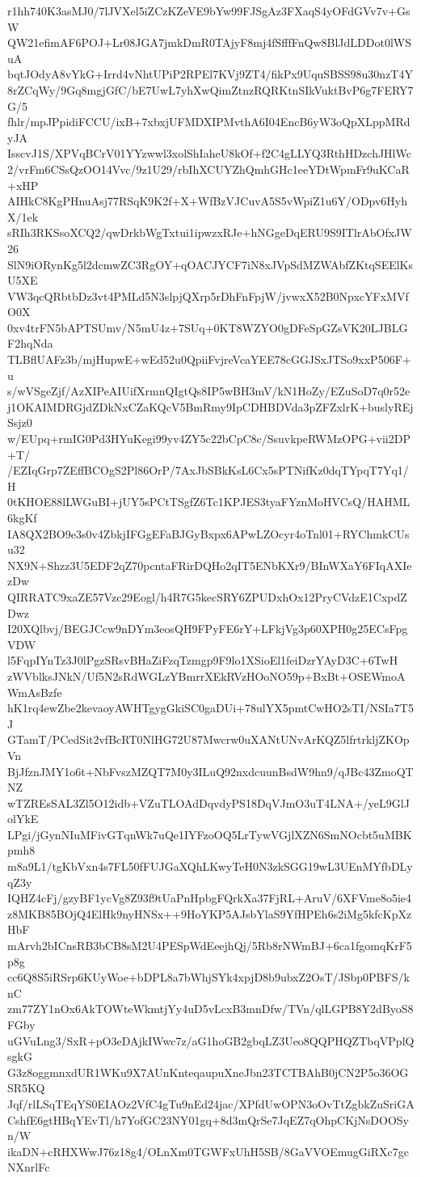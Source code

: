 r1hh740K3asMJ0/7lJVXel5iZCzKZeVE9bYw99FJSgAz3FXaqS4yOFdGVv7v+GsW
QW21efimAF6POJ+Lr08JGA7jmkDmR0TAjyF8mj4fSfffFnQw8BlJdLDDot0lWSuA
bqtJOdyA8vYkG+Irrd4vNhtUPiP2RPEl7KVj9ZT4/fikPx9UquSBSS98u30nzT4Y
8rZCqWy/9Gq8mgjGfC/bE7UwL7yhXwQimZtnzRQRKtnSIkVuktBvP6g7FERY7G/5
fhlr/mpJPpidiFCCU/ixB+7xbxjUFMDXIPMvthA6I04EncB6yW3oQpXLppMRdyJA
IsscvJ1S/XPVqBCrV01YYzwwl3xolShIaheU8kOf+f2C4gLLYQ3RthHDzchJHlWc
2/vrFm6CSsQzOO14Vvc/9z1U29/rbIhXCUYZhQmhGHc1eeYDtWpmFr9uKCaR+xHP
AIHkC8KgPHnuAsj77RSqK9K2f+X+WfBzVJCuvA5S5vWpiZ1u6Y/ODpv6HyhX/1ek
sRIh3RKSsoXCQ2/qwDrkbWgTxtui1ipwzxRJe+hNGgeDqERU9S9ITlrAbOfxJW26
SlN9iORynKg5l2dcmwZC3RgOY+qOACJYCF7iN8xJVpSdMZWAbfZKtqSEElKsU5XE
VW3qcQRbtbDz3vt4PMLd5N3slpjQXrp5rDhFnFpjW/jvwxX52B0NpxcYFxMVfO0X
0xv4trFN5bAPTSUmv/N5mU4z+7SUq+0KT8WZYO0gDFeSpGZsVK20LJBLGF2hqNda
TLBflUAFz3b/mjHupwE+wEd52u0QpiiFvjreVcaYEE78cGGJSxJTSo9xxP506F+u
s/wVSgeZjf/AzXIPeAIUifXrmnQIgtQs8IP5wBH3mV/kN1HoZy/EZuSoD7q0r52e
j1OKAIMDRGjdZDkNxCZaKQcV5BmRmy9IpCDHBDVda3pZFZxlrK+buslyREjSsjz0
w/EUpq+rmIG0Pd3HYuKegi99yv4ZY5c22bCpC8c/SsuvkpeRWMzOPG+vii2DP+T/
/EZIqGrp7ZEffBCOgS2Pl86OrP/7AxJbSBkKsL6Cx5sPTNifKz0dqTYpqT7Yq1/H
0tKHOE88lLWGuBI+jUY5sPCtTSgfZ6Tc1KPJES3tyaFYznMoHVCsQ/HAHML6kgKf
IA8QX2BO9e3s0v4ZbkjIFGgEFaBJGyBxpx6APwLZOcyr4oTnl01+RYChmkCUsu32
NX9N+Shzz3U5EDF2qZ70pcntaFRirDQHo2qIT5ENbKXr9/BInWXaY6FIqAXIezDw
QIRRATC9xaZE57Vzc29Eogl/h4R7G5kecSRY6ZPUDxhOx12PryCVdzE1CxpdZDwz
I20XQlbvj/BEGJCcw9nDYm3eosQH9FPyFE6rY+LFkjVg3p60XPH0g25ECsFpgVDW
l5FqpIYnTz3J0lPgzSRsvBHaZiFzqTzmgp9F9lo1XSioEl1feiDzrYAyD3C+6TwH
zWVblksJNkN/Uf5N2sRdWGLzYBmrrXEkRVzHOoNO59p+BxBt+OSEWmoAWmAsBzfe
hK1rq4ewZbe2kevaoyAWHTgygGkiSC0gaDUi+78ulYX5pmtCwHO2sTI/NSIa7T5J
GTamT/PCedSit2vfBcRT0NlHG72U87Mwcrw0uXANtUNvArKQZ5lfrtrkljZKOpVn
BjJfznJMY1o6t+NbFvszMZQT7M0y3ILuQ92nxdcuunBsdW9hn9/qJBc43ZmoQTNZ
wTZREsSAL3Zl5O12idb+VZuTLOAdDqvdyPS18DqVJmO3uT4LNA+/yeL9GlJolYkE
LPgi/jGynNIuMFivGTqnWk7uQe1IYFzoOQ5LrTywVGjlXZN6SmNOcbt5uMBKpmh8
m8a9L1/tgKbVxn4s7FL50fFUJGaXQhLKwyTeH0N3zkSGG19wL3UEnMYfbDLyqZ3y
IQHZ4cFj/gzyBF1ycVg8Z93f9tUaPnHpbgFQrkXa37FjRL+AruV/6XFVme8o5ie4
z8MKB85BOjQ4ElHk9nyHNSx++9HoYKP5AJsbYlaS9YfHPEh6s2iMg5kfcKpXzHbF
mArvh2bICnsRB3bCB8sM2U4PESpWdEeejhQj/5Rb8rNWmBJ+6ca1fgomqKrF5p8g
cc6Q8S5iRSrp6KUyWoe+bDPL8a7bWhjSYk4xpjD8b9ubxZ2OsT/JSbp0PBFS/knC
zm77ZY1nOx6AkTOWteWkmtjYy4uD5vLcxB3mnDfw/TVn/qlLGPB8Y2dByoS8FGby
uGVuLng3/SxR+pO3eDAjkIWwc7z/aG1hoGB2gbqLZ3Ueo8QQPHQZTbqVPplQsgkG
G3z8oggmnxdUR1WKu9X7AUnKnteqaupuXneJbn23TCTBAhB0jCN2P5o36OGSR5KQ
Jqf/rlLSqTEqYS0EIAOz2VfC4gTu9nEd24jac/XPfdUwOPN3oOvTtZgbkZuSriGA
CshfE6gtHBqYEvTl/h7YofGC23NY01gq+8d3mQrSe7JqEZ7qOhpCKjNsDOOSyn/W
ikaDN+cRHXWwJ76z18g4/OLnXm0TGWFxUhH5SB/8GaVVOEmugGiRXc7gcNXnrlFc
